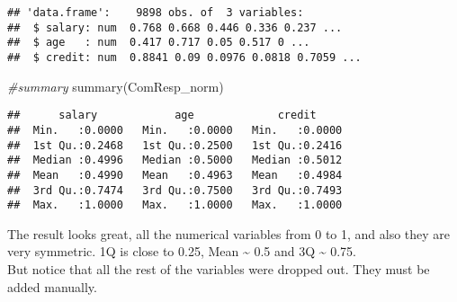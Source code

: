 \documentclass[
]{article}
\newenvironment{Shaded}{\begin{snugshade}}{\end{snugshade}}
\newcommand{\CommentTok}[1]{\textcolor[rgb]{0.56,0.35,0.01}{\textit{#1}}}
\newcommand{\FunctionTok}[1]{\textcolor[rgb]{0.00,0.00,0.00}{#1}}
\newcommand{\NormalTok}[1]{#1}
\newcommand{\OtherTok}[1]{\textcolor[rgb]{0.56,0.35,0.01}{#1}}
\newcommand{\SpecialCharTok}[1]{\textcolor[rgb]{0.00,0.00,0.00}{#1}}
\begin{document}
\begin{verbatim}
## 'data.frame':    9898 obs. of  3 variables:
##  $ salary: num  0.768 0.668 0.446 0.336 0.237 ...
##  $ age   : num  0.417 0.717 0.05 0.517 0 ...
##  $ credit: num  0.8841 0.09 0.0976 0.0818 0.7059 ...
\end{verbatim}

\begin{Shaded}
\begin{Highlighting}[]
\CommentTok{\#summary}
\FunctionTok{summary}\NormalTok{(ComResp\_norm)}
\end{Highlighting}
\end{Shaded}

\begin{verbatim}
##      salary            age             credit      
##  Min.   :0.0000   Min.   :0.0000   Min.   :0.0000  
##  1st Qu.:0.2468   1st Qu.:0.2500   1st Qu.:0.2416  
##  Median :0.4996   Median :0.5000   Median :0.5012  
##  Mean   :0.4990   Mean   :0.4963   Mean   :0.4984  
##  3rd Qu.:0.7474   3rd Qu.:0.7500   3rd Qu.:0.7493  
##  Max.   :1.0000   Max.   :1.0000   Max.   :1.0000
\end{verbatim}

The result looks great, all the numerical variables from 0 to 1, and
also they are very symmetric. 1Q is close to 0.25, Mean
\textasciitilde{} 0.5 and 3Q \textasciitilde{} 0.75.\\
But notice that all the rest of the variables were dropped out. They
must be added manually.

\begin{Shaded}
\end{Shaded}
\end{document}
